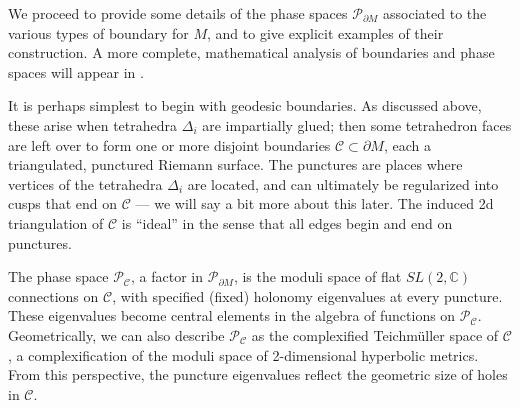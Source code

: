 \documentclass[hyper,letterpaper]{JHEP3}
\numberwithin{equation}{section}
\newcommand{\C}{{\mathbb C}}
\newcommand{\pd}{\partial}
\newcommand{\CC}{\mathcal{C}}
\newcommand{\CP}{\mathcal{P}}
\begin{document}
We proceed to provide some details of the phase spaces $\CP_{\pd M}$ associated to the various types of boundary for $M$, and to give explicit examples of their construction. A more complete, mathematical analysis of boundaries and phase spaces will appear in \cite{DGGV-hybrid}.

It is perhaps simplest to begin with geodesic boundaries. As discussed above, these arise when tetrahedra $\Delta_i$ are impartially glued; then some tetrahedron faces are left over to form one or more disjoint boundaries $\CC \subset \pd M$, each a triangulated, punctured Riemann surface.
The punctures are places where vertices of the tetrahedra $\Delta_i$ are located, and can ultimately be regularized into cusps that end on $\CC$ --- we will say a bit more about this later. The induced 2d triangulation of $\CC$ is ``ideal'' in the sense that all edges begin and end on punctures.




The phase space $\CP_\CC$, a factor in $\CP_{\pd M}$, is the moduli space of flat $SL(2,\C)$ connections on $\CC$, with specified (fixed) holonomy eigenvalues at every puncture. These eigenvalues become central elements in the algebra of functions on $\CP_\CC$. Geometrically, we can also describe $\CP_\CC$ as the complexified Teichm\"uller space of $\CC$, a complexification of the moduli space of 2-dimensional hyperbolic metrics. From this perspective, the puncture eigenvalues reflect the geometric size of holes in $\CC$.
\end{document}
